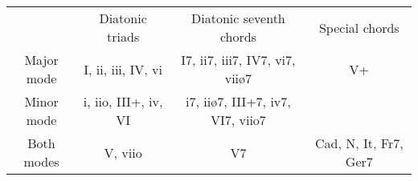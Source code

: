 \begin{tabular}{cccc}
            & Diatonic triads      & Diatonic seventh chords          & Special chords        \\
Major mode & I, ii, iii, IV, vi   & I7, ii7, iii7, IV7, vi7, viiø7   & V+                    \\
Minor mode & i, iio, III+, iv, VI & i7, iiø7, III+7, iv7, VI7, viio7 &                       \\
Both modes & V, viio              & V7                               & Cad, N, It, Fr7, Ger7
\end{tabular}
